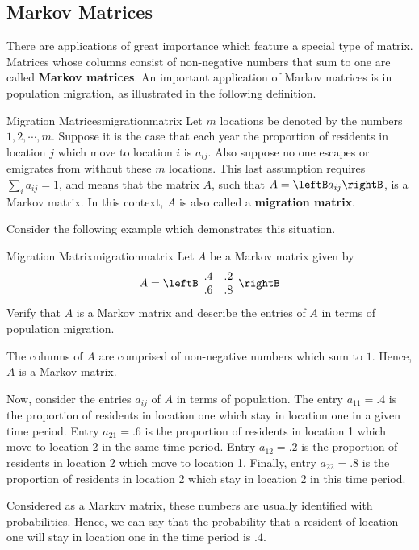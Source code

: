 \subsection{Markov Matrices}

There are applications of great importance which feature a special type of matrix.  Matrices whose columns consist of non-negative numbers that sum to one are
 called \textbf{Markov matrices}. An important application of Markov matrices is
in population migration, as illustrated in the following definition. 

\begin{definition}{Migration Matrices}{migrationmatrix}
Let $m$ locations be denoted by the numbers $1,2,\cdots ,m.$ Suppose
it is the case that each year the proportion of residents in location
$j$ which move to location $i$ is $a_{ij}$. Also suppose no one
escapes or emigrates from without these $m$ locations. This last
assumption requires $\sum_{i}a_{ij}=1$, and means that the matrix $A$,
such that $A = \leftB a_{ij} \rightB$, is a Markov matrix. In this context,
$A$ is also called a \textbf{migration matrix}.
\end{definition}

Consider the following example which demonstrates this situation.

\begin{example}{Migration Matrix}{migrationmatrix}
Let $A$ be a Markov matrix given by 
\begin{equation*}
A = 
\leftB
\begin{array}{rr}
.4 & .2 \\
.6 & .8
\end{array}
\rightB
\end{equation*}
Verify that $A$ is a Markov matrix and describe the entries of $A$ in terms of population migration.
\end{example}

\begin{solution}
The columns of $A$ are comprised of non-negative numbers which sum to $1$. Hence, $A$ is a Markov matrix. 

Now, consider the entries $a_{ij}$ of $A$ in terms of population. The
entry $a_{11} = .4$ is the proportion of residents in location one
which stay in location one in a given time period.  Entry $a_{21} =
.6$ is the proportion of residents in location 1 which move to
location 2 in the same time period. Entry $a_{12} = .2$ is the
proportion of residents in location 2 which move to location
1. Finally, entry $a_{22} = .8$ is the proportion of residents in
location 2 which stay in location 2 in this time period.  

Considered as a Markov matrix, these numbers are usually identified
with probabilities. Hence, we can say that the probability that a
resident of location one will stay in location one in the time period
is $.4$.
\end{solution}

